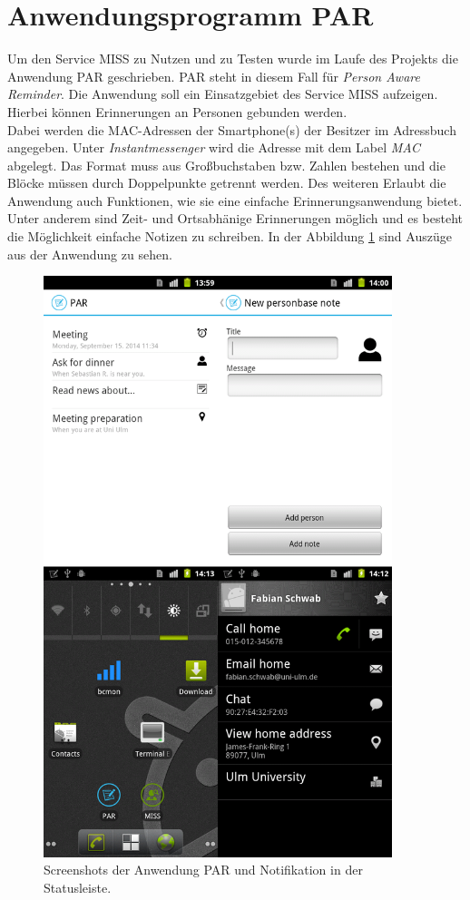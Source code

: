 \documentclass[]{report}
\begin{document}
\section{Anwendungsprogramm PAR}\label{lab:par}
Um den Service MISS zu Nutzen und zu Testen wurde im Laufe des Projekts die Anwendung PAR geschrieben. PAR steht in diesem Fall für \textit{Person Aware Reminder}. Die Anwendung soll ein Einsatzgebiet des Service MISS aufzeigen. Hierbei können Erinnerungen an Personen gebunden werden. \\
Dabei werden die MAC-Adressen der Smartphone(s) der Besitzer im Adressbuch angegeben. Unter \textit{Instantmessenger} wird die Adresse mit dem Label \textit{MAC} abgelegt. Das Format muss aus Großbuchstaben bzw. Zahlen bestehen und die Blöcke müssen durch Doppelpunkte getrennt werden. Des weiteren Erlaubt die Anwendung auch Funktionen, wie sie eine einfache Erinnerungsanwendung bietet. Unter anderem sind Zeit- und Ortsabhänige Erinnerungen möglich und es besteht die Möglichkeit einfache Notizen zu schreiben. In der Abbildung \ref{fig:par} sind Auszüge aus der Anwendung zu sehen. 
\begin{figure}[h!]
    \centering 
    \includegraphics[width=4.0in]{bilder/par.png}
    \caption{Screenshots der Anwendung PAR und Notifikation in der Statusleiste.}
    \label{fig:par}
\end{figure}


\end{document}
